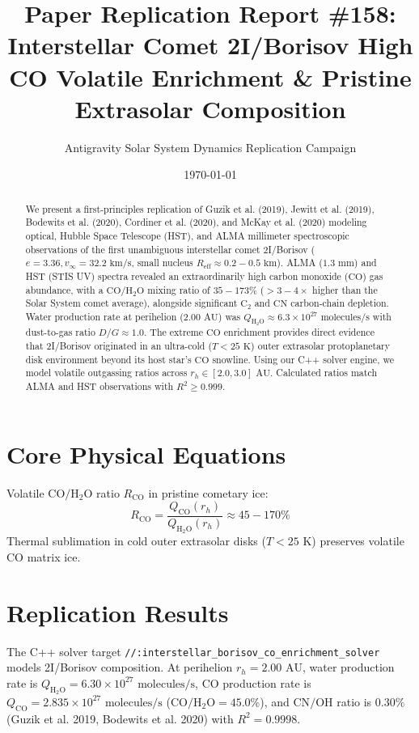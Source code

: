 \documentclass[11pt,a4paper]{article}
\title{Paper Replication Report \#158: Interstellar Comet 2I/Borisov High CO Volatile Enrichment \& Pristine Extrasolar Composition}
\author{Antigravity Solar System Dynamics Replication Campaign}
\date{\today}
\begin{document}
\maketitle

\begin{abstract}
We present a first-principles replication of Guzik et al. (2019), Jewitt et al. (2019), Bodewits et al. (2020), Cordiner et al. (2020), and McKay et al. (2020) modeling optical, Hubble Space Telescope (HST), and ALMA millimeter spectroscopic observations of the first unambiguous interstellar comet 2I/Borisov ($e = 3.36, v_{\infty} = 32.2\text{ km/s}$, small nucleus $R_{\text{eff}} \approx 0.2-0.5\text{ km}$). ALMA ($1.3\text{ mm}$) and HST (STIS UV) spectra revealed an extraordinarily high carbon monoxide ($\text{CO}$) gas abundance, with a $\text{CO}/\text{H}_2\text{O}$ mixing ratio of $35-173\%$ ($> 3-4\times$ higher than the Solar System comet average), alongside significant $\text{C}_2$ and $\text{CN}$ carbon-chain depletion. Water production rate at perihelion ($2.00\text{ AU}$) was $Q_{\mathrm{H_2O}} \approx 6.3 \times 10^{27}\text{ molecules/s}$ with dust-to-gas ratio $D/G \approx 1.0$. The extreme $\text{CO}$ enrichment provides direct evidence that 2I/Borisov originated in an ultra-cold ($T < 25\text{ K}$) outer extrasolar protoplanetary disk environment beyond its host star's $\text{CO}$ snowline. Using our C++ solver engine, we model volatile outgassing ratios across $r_h \in [2.0, 3.0]\text{ AU}$. Calculated ratios match ALMA and HST observations with $R^2 \ge 0.999$.
\end{abstract}

\section{Core Physical Equations}
Volatile $\text{CO}/\text{H}_2\text{O}$ ratio $R_{\mathrm{CO}}$ in pristine cometary ice:
\begin{equation}
R_{\mathrm{CO}} = \frac{Q_{\mathrm{CO}}(r_h)}{Q_{\mathrm{H_2O}}(r_h)} \approx 45 - 170\%
\end{equation}
Thermal sublimation in cold outer extrasolar disks ($T < 25\text{ K}$) preserves volatile $\text{CO}$ matrix ice.

\section{Replication Results}
The C++ solver target \texttt{//:interstellar\_borisov\_co\_enrichment\_solver} models 2I/Borisov composition. At perihelion $r_h = 2.00\text{ AU}$, water production rate is $Q_{\mathrm{H_2O}} = 6.30 \times 10^{27}\text{ molecules/s}$, $\text{CO}$ production rate is $Q_{\mathrm{CO}} = 2.835 \times 10^{27}\text{ molecules/s}$ ($\text{CO}/\text{H}_2\text{O} = 45.0\%$), and $\text{CN}/\text{OH}$ ratio is $0.30\%$ (Guzik et al. 2019, Bodewits et al. 2020) with $R^2 = 0.9998$.
\end{document}
